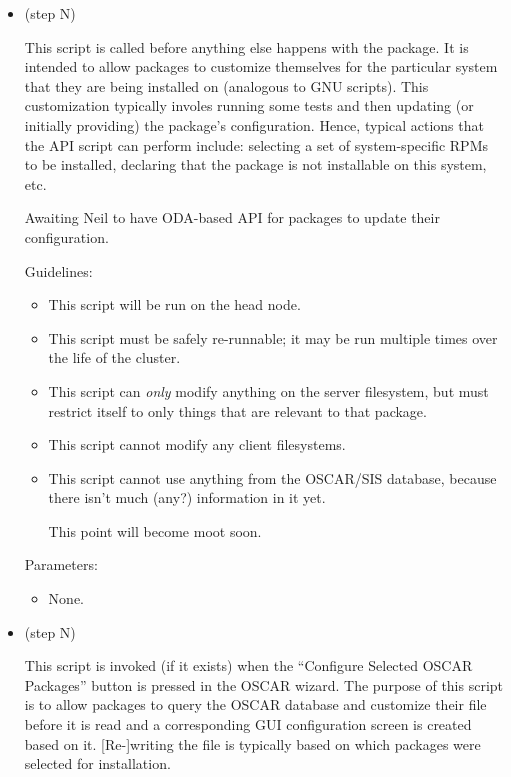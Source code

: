 \begin{itemize}

\begchange

\item {} (step N)
  
  This script is called before anything else happens with the package.
  It is intended to allow packages to customize themselves for the
  particular system that they are being installed on (analogous to GNU
   scripts).  This customization typically involes
  running some tests and then updating (or initially providing) the
  package's configuration.  Hence, typical actions that the
   API script can perform include: selecting a set of
  system-specific RPMs to be installed, declaring that the package is
  not installable on this system, etc.

  \begin{discuss}
    Awaiting Neil to have ODA-based API for packages to update their
    configuration.
  \end{discuss}

  Guidelines:

  \begin{itemize}
  \item This script will be run on the head node.
  \item This script must be safely re-runnable; it may be run multiple
    times over the life of the cluster.
  \item This script can {\em only} modify anything on the server
    filesystem, but must restrict itself to only things that are
    relevant to that package.
  \item This script cannot modify any client filesystems.
  \item This script cannot use anything from the OSCAR/SIS database,
    because there isn't much (any?) information in it yet.
    \begin{discuss}
      This point will become moot soon.
    \end{discuss}
  \end{itemize}

  Parameters:
  
  \begin{itemize}
  \item None.
  \end{itemize}

\item {} (step N)
  
  This script is invoked (if it exists) when the ``Configure Selected
  OSCAR Packages'' button is pressed in the OSCAR wizard.  The purpose
  of this script is to allow packages to query the OSCAR database and
  customize their  file before it is read and
  a corresponding GUI configuration screen is created based on it.
  [Re-]writing the  file is typically based on
  which packages were selected for installation.


\end{itemize}
